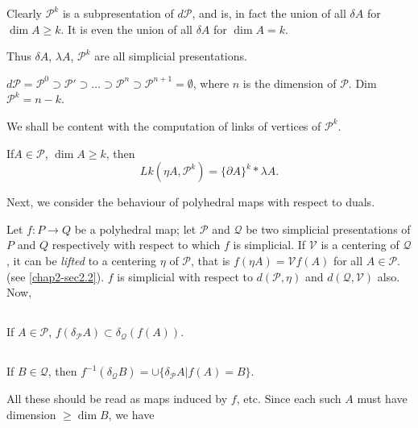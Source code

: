 Clearly $\mathscr{P}^{k}$ is a subpresentation of $d\mathscr{P}$, and is, in fact the union of all $\delta A$ for $\dim A\geq k$. It is even the union of all $\delta A$ for $\dim A=k$.

Thus $\delta A$, $\lambda A$, $\mathscr{P}^{k}$ are all simplicial presentations. 

\begin{ex}\label{chap4-ex4.2.9}
$d\mathscr{P}=\mathscr{P}^{0}\supset \mathscr{P}'\supset \ldots \supset \mathscr{P}^{n}\supset \mathscr{P}^{n+1}=\emptyset$, where $n$ is the dimension of $\mathscr{P}$. Dim $\mathscr{P}^{k}=n-k$.
\end{ex}

We shall be content with the computation of links of vertices of $\mathscr{P}^{k}$. 

\begin{ex}\label{chap4-ex4.2.10}
If\pageoriginale $A\in\mathscr{P}$, $\dim A\geq k$, then
$$
Lk(\eta A,\mathscr{P}^{k})=\{\partial A\}^{k}\ast \lambda A.
$$
\end{ex}

Next, we consider the behaviour of polyhedral maps with respect to duals.

Let $f:P\to Q$ be a polyhedral map; let $\mathscr{P}$ and $\mathcal{Q}$ be two simplicial presentations of $P$ and $Q$ respectively with respect to which $f$ is simplicial. If $\mathscr{V}$ is a centering of $\mathcal{Q}$, it can be {\em lifted} to a centering $\eta$ of $\mathscr{P}$, that is $f(\eta A)=\mathscr{V}f(A)$ for all $A\in \mathscr{P}$. (see \ref{chap2-sec2.2}). $f$ is simplicial with respect to $d(\mathscr{P},\eta)$ and $d(\mathcal{Q},\mathscr{V})$ also. Now,

\setcounter{subsection}{10}
\subsection{}\label{chap4-sec4.2.11}
If $A\in \mathscr{P}$, $f(\delta_{\mathscr{P}}A)\subset \delta_{\mathcal{Q}}(f(A))$. 

\subsection{}\label{chap4-sec4.2.12}
If $B\in \mathcal{Q}$, then $f^{-1}(\delta_{\mathcal{Q}}B)=\cup \{\delta_{\mathscr{P}}A|f(A)=B\}$. 

\begin{remark*}
All these should be read as maps induced by $f$, etc. Since each such $A$ must have dimension $\geq \dim B$, we have
\end{remark*}


